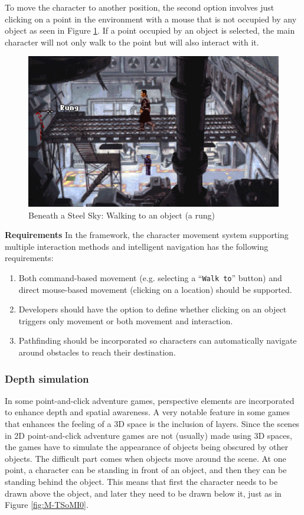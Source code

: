 To move the character to another position, the second option involves just clicking on a point in the environment with a mouse that is not occupied by any object as seen in Figure \ref{fig:M-BaSS}. If a point occupied by an object is selected, the main character will not only walk to the point but will also interact with it.

\begin{figure}[H]
\centering
\includegraphics[width=.8\linewidth]{img/M-BaSS.png}
\caption{Beneath a Steel Sky: Walking to an object (a rung)}
\label{fig:M-BaSS}
\end{figure}

\textbf{Requirements} \quad In the framework, the character movement system supporting multiple interaction methods and intelligent navigation has the following requirements:

\begin{enumerate}[label=\color{teal}\textbf{R{\arabic*}},resume]
  \item \label{intro:req:com+mouse_move} Both command-based movement (e.g. selecting a “\texttt{Walk to}” button) and direct mouse-based movement (clicking on a location) should be supported.
  \item \label{intro:req:mox_move} Developers should have the option to define whether clicking on an object triggers only movement or both movement and interaction.
  \item \label{intro:req:pathfinding}Pathfinding should be incorporated so characters can automatically navigate around obstacles to reach their destination.
\end{enumerate}

\subsubsection{Depth simulation}
In some point-and-click adventure games, perspective elements are incorporated to enhance depth and spatial awareness. 
A very notable feature in some games that enhances the feeling of a 3D space is the inclusion of layers. Since the scenes in 2D point-and-click adventure games are not (usually) made using 3D spaces, the games have to simulate the appearance of objects being obscured by other objects. The difficult part comes when objects move around the scene. At one point, a character can be standing in front of an object, and then they can be standing behind the object. This means that first the character needs to be drawn above the object, and later they need to be drawn below it, just as in Figure \ref{fig:M-TSoMI0}.

